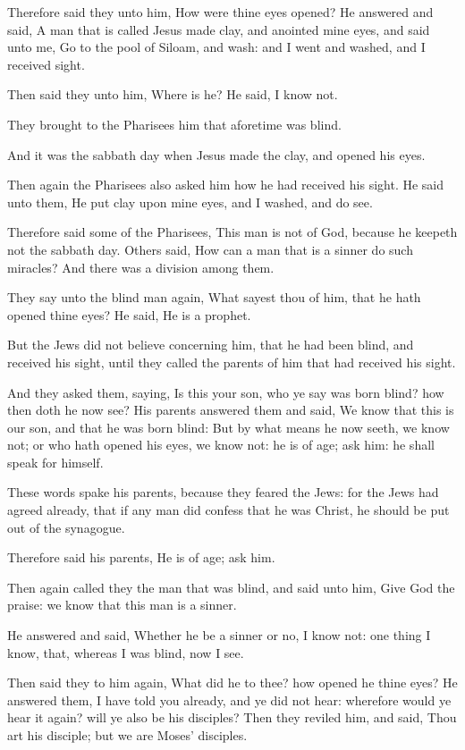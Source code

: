\Verse Therefore said they unto him, How were thine eyes opened?  \Verse He answered and said, A man that is called Jesus made clay, and anointed mine eyes, and said unto me, Go to the pool of Siloam, and wash: and I went and washed, and I received sight.

\Verse Then said they unto him, Where is he? He said, I know not.

\Verse They brought to the Pharisees him that aforetime was blind.

\Verse And it was the sabbath day when Jesus made the clay, and opened his eyes.

\Verse Then again the Pharisees also asked him how he had received his sight. He said unto them, He put clay upon mine eyes, and I washed, and do see.

\Verse Therefore said some of the Pharisees, This man is not of God, because he keepeth not the sabbath day. Others said, How can a man that is a sinner do such miracles? And there was a division among them.

\Verse They say unto the blind man again, What sayest thou of him, that he hath opened thine eyes? He said, He is a prophet.

\Verse But the Jews did not believe concerning him, that he had been blind, and received his sight, until they called the parents of him that had received his sight.

\Verse And they asked them, saying, Is this your son, who ye say was born blind? how then doth he now see?  \Verse His parents answered them and said, We know that this is our son, and that he was born blind: \Verse But by what means he now seeth, we know not; or who hath opened his eyes, we know not: he is of age; ask him: he shall speak for himself.

\Verse These words spake his parents, because they feared the Jews: for the Jews had agreed already, that if any man did confess that he was Christ, he should be put out of the synagogue.

\Verse Therefore said his parents, He is of age; ask him.

\Verse Then again called they the man that was blind, and said unto him, Give God the praise: we know that this man is a sinner.

\Verse He answered and said, Whether he be a sinner or no, I know not: one thing I know, that, whereas I was blind, now I see.

\Verse Then said they to him again, What did he to thee? how opened he thine eyes?  \Verse He answered them, I have told you already, and ye did not hear: wherefore would ye hear it again? will ye also be his disciples?  \Verse Then they reviled him, and said, Thou art his disciple; but we are Moses' disciples.

